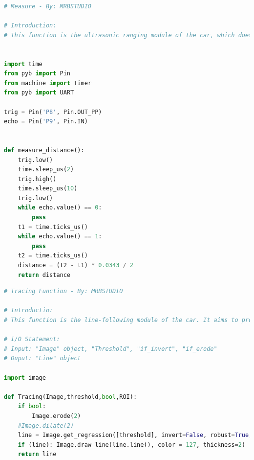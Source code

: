 \documentclass[12pt, a4paper, oneside]{report}
\begin{document}
\begin{lstlisting}[language=Python]
# Measure - By: MRBSTUDIO 

# Introduction:
# This function is the ultrasonic ranging module of the car, which does not require IO.


import time
from pyb import Pin
from machine import Timer
from pyb import UART

trig = Pin('P8', Pin.OUT_PP)
echo = Pin('P9', Pin.IN)


def measure_distance():
    trig.low()
    time.sleep_us(2)
    trig.high()
    time.sleep_us(10)
    trig.low()
    while echo.value() == 0:
        pass
    t1 = time.ticks_us()
    while echo.value() == 1:
        pass
    t2 = time.ticks_us()
    distance = (t2 - t1) * 0.0343 / 2
    return distance
\end{lstlisting}
\begin{lstlisting}[language=Python]
# Tracing Function - By: MRBSTUDIO 

# Introductio:
# This function is the line-following module of the car. It aims to process the input image and output a "line" object

# I/O Statement:
# Input: "Image" object, "Threshold", "if_invert", "if_erode"
# Ouput: "Line" object

import image

def Tracing(Image,threshold,bool,ROI):
    if bool:
        Image.erode(2)
    #Image.dilate(2)
    line = Image.get_regression([threshold], invert=False, robust=True, roi=ROI)
    if (line): Image.draw_line(line.line(), color = 127, thickness=2)
    return line
\end{lstlisting}
\end{document}
